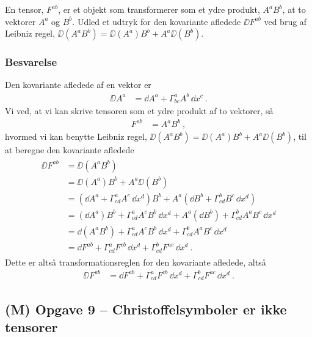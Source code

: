 \documentclass[../main.tex]{subfiles}
\begin{document}
En tensor, $F^{ab}$, er et objekt som transformerer som et ydre produkt, $A^a B^b$, at to vektorer $A^a$ og $B^b$. Udled et udtryk for den kovariante afledede $\DD F^{ab}$ ved brug af Leibniz regel, $\DD(A^a B^b) = \DD(A^a)B^b + A^a \DD (B^b)$.


\subsubsection{Besvarelse}

Den kovariante afledede af en vektor er
\begin{align}
    \DD A^a &= \dd A^a + \Gamma^a_{bc} A^b\, \dd x^c \: .
\end{align}
Vi ved, at vi kan skrive tensoren som et ydre produkt af to vektorer, så
\begin{align}
    F^{ab} &= A^a B^b \: ,
\end{align}
hvormed vi kan benytte Leibniz regel, $\DD(A^a B^b) = \DD(A^a)B^b + A^a \DD (B^b)$, til at beregne den kovariante afledede
\begin{align}
\begin{split}
    \DD F^{ab} &= \DD(A^a B^b) \\
        &= \DD(A^a)B^b + A^a \DD (B^b) \\
        &= \left( \dd A^a + \Gamma^a_{cd} A^c\, \dd x^d \right) B^b + A^a \left( \dd B^b + \Gamma^b_{cd} B^c\, \dd x^d \right) \\
        &= \left( \dd A^a \right) B^b + \Gamma^a_{cd} A^c B^b\, \dd x^d + A^a \left( \dd B^b \right) + \Gamma^b_{cd} A^a B^c\, \dd x^d \\
        &= \dd \left( A^a B^b \right) + \Gamma^a_{cd} A^c B^b\, \dd x^d + \Gamma^b_{cd} A^a B^c\, \dd x^d \\
        &= \dd F^{ab} + \Gamma^a_{cd} F^{cb}\, \dd x^d + \Gamma^b_{cd} F^{ac}\, \dd x^d \: .
\end{split}
\end{align}
Dette er altså transformationsreglen for den kovariante afledede, altså
\begin{align}
    \DD F^{ab} &= \dd F^{ab} + \Gamma^a_{cd} F^{cb}\, \dd x^d + \Gamma^b_{cd} F^{ac}\, \dd x^d \: .
\end{align}




\subsection{(M) Opgave 9 -- Christoffelsymboler er ikke tensorer}
\setcounter{subsection}{9}
\setcounter{equation}{0}
\end{document}
